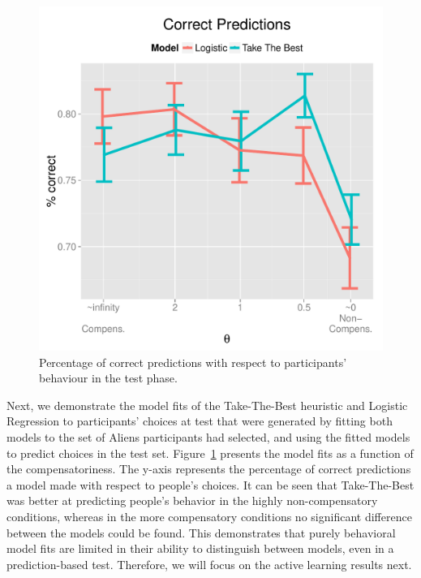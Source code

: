 \documentclass[10pt,letterpaper]{article}
\begin{document}
\begin{figure}[htb!]
	\centering
			\caption{Percentage of correct predictions with respect to participants' behaviour in the test phase.}
	\label{percentage}
	\centering
	\includegraphics[scale=0.4]{percentage.pdf}

\end{figure}

Next, we demonstrate the model fits of the Take-The-Best heuristic and Logistic Regression to participants' choices at test that were generated by fitting both models to the set of Aliens participants had selected, and using the fitted models to predict choices in the test set. Figure~\ref{percentage} presents the model fits as a function of the compensatoriness. The y-axis represents the percentage of correct predictions a model made with respect to people's choices. It can be seen that Take-The-Best was better at predicting people's behavior in the highly non-compensatory conditions,  whereas in the more compensatory conditions no significant difference between the models could be found. This demonstrates that purely behavioral model fits are limited in their ability to distinguish between models, even in a prediction-based test. Therefore, we will focus on the active learning results next.\\
\end{document}
